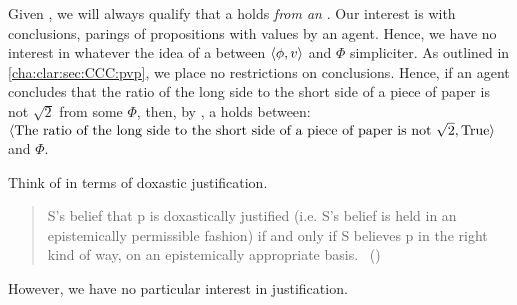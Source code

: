 \begin{note}
  Given \supportI{}, we will always qualify that a \ros{} holds \emph{from an \agpe{}}.
  Our interest is with conclusions, parings of propositions with values by an agent.
  Hence, we have no interest in whatever the idea of a \ros{} between \(\langle \phi, v \rangle\) and \(\Phi\) simpliciter.
  As outlined in \autoref{cha:clar:sec:CCC:pvp}, we place no restrictions on conclusions.
  Hence, if an agent concludes that the ratio of the long side to the short side of a piece of paper is not \(\sqrt{2}\) from some \poP{} \(\Phi\), then, by \supportI{}, a \ros{} holds between:
  \(\langle \text{The ratio of the long side to the short side of a piece of paper is not }\sqrt{2}, \text{True} \rangle\) and \(\Phi\).
\end{note}

\begin{note}
  Think of \supportI{} in terms of doxastic justification.

  \begin{quote}
    S's belief that p is doxastically justified (i.e. S's belief is held in an epistemically permissible fashion) if and only if S believes p in the right kind of way, on an epistemically appropriate basis.%
    \mbox{ }\hfill\mbox{(\citeyear{Bondy:2018tk})}
  \end{quote}

  However, we have no particular interest in justification.
\end{note}

